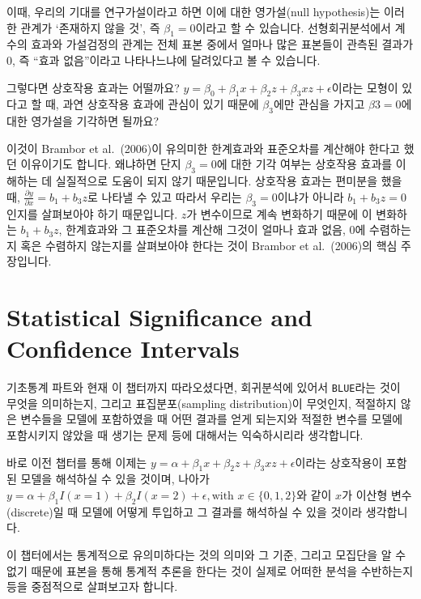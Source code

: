 \documentclass[
]{book}
\begin{document}
이때, 우리의 기대를 연구가설이라고 하면 이에 대한 영가설(null hypothesis)는 이러한 관계가 `존재하지 않을 것', 즉 \(\beta_1 = 0\)이라고 할 수 있습니다. 선형회귀분석에서 계수의 효과와 가설검정의 관계는 전체 표본 중에서 얼마나 많은 표본들이 관측된 결과가 0, 즉 ``효과 없음''이라고 나타나느냐에 달려있다고 볼 수 있습니다.

그렇다면 상호작용 효과는 어떨까요? \(y = \beta_0 + \beta_1 x + \beta_2 z + \beta_3 xz + \epsilon\)이라는 모형이 있다고 할 때, 과연 상호작용 효과에 관심이 있기 때문에 \(\beta_3\)에만 관심을 가지고 \(\beta3 = 0\)에 대한 영가설을 기각하면 될까요?

이것이 Brambor et al.~(2006)이 유의미한 한계효과와 표준오차를 계산해야 한다고 했던 이유이기도 합니다. 왜냐하면 단지 \(\beta_3 = 0\)에 대한 기각 여부는 상호작용 효과를 이해하는 데 실질적으로 도움이 되지 않기 때문입니다. 상호작용 효과는 편미분을 했을 때, \(\frac{\partial y}{\partial x} = b_1+ b_3 z\)로 나타낼 수 있고 따라서 우리는 \(\beta_3 = 0\)이냐가 아니라 \(b_1+ b_3 z = 0\)인지를 살펴보아야 하기 때문입니다. \(z\)가 변수이므로 계속 변화하기 때문에 이 변화하는 \(b_1+ b_3 z\), 한계효과와 그 표준오차를 계산해 그것이 얼마나 효과 없음, 0에 수렴하는지 혹은 수렴하지 않는지를 살펴보아야 한다는 것이 Brambor et al.~(2006)의 핵심 주장입니다.

\hypertarget{statistical-significance-and-confidence-intervals}{%
\chapter{Statistical Significance and Confidence Intervals}\label{statistical-significance-and-confidence-intervals}}

기초통계 파트와 현재 이 챕터까지 따라오셨다면, 회귀분석에 있어서 \texttt{BLUE}라는 것이 무엇을 의미하는지, 그리고 표집분포(sampling distribution)이 무엇인지, 적절하지 않은 변수들을 모델에 포함하였을 때 어떤 결과를 얻게 되는지와 적절한 변수를 모델에 포함시키지 않았을 때 생기는 문제 등에 대해서는 익숙하시리라 생각합니다.

바로 이전 챕터를 통해 이제는 \(y = \alpha + \beta_1x + \beta_2z + \beta_3xz + \epsilon\)이라는 상호작용이 포함된 모델을 해석하실 수 있을 것이며, 나아가 \(y = \alpha + \beta_1I(x = 1) + \beta_2I(x = 2) + \epsilon, \text{with }x \in \{0, 1,2\}\)와 같이 \(x\)가 이산형 변수(discrete)일 때 모델에 어떻게 투입하고 그 결과를 해석하실 수 있을 것이라 생각합니다.

이 챕터에서는 통계적으로 유의미하다는 것의 의미와 그 기준, 그리고 모집단을 알 수 없기 때문에 표본을 통해 통계적 추론을 한다는 것이 실제로 어떠한 분석을 수반하는지 등을 중점적으로 살펴보고자 합니다.
\end{document}
